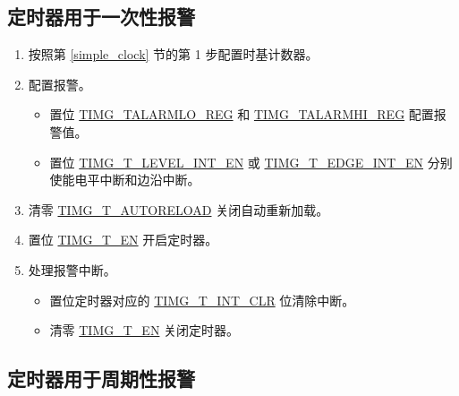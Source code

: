 \documentclass[main\_\_CN.tex]{subfiles}
\begin{document}
\subsection{定时器用于一次性报警}\label{Timer_Alarm}
\begin{enumerate}
    \item 按照第 \ref{simple_clock} 节的第 1 步配置时基计数器。
    \item 配置报警。
    \begin{itemize}
        \item 置位 \hyperref[regdesc:TIMGTXALARMLOREG]{TIMG\_TALARMLO\_REG} 和 \hyperref[regdesc:TIMGTXALARMHIREG]{TIMG\_TALARMHI\_REG} 配置报警值。
        \item 置位 \hyperref[fielddesc:TIMGTXLEVELINTEN]{TIMG\_T\_LEVEL\_INT\_EN} 或 \hyperref[fielddesc:TIMGTXEDGEINTEN]{TIMG\_T\_EDGE\_INT\_EN} 分别使能电平中断和边沿中断。
    \end{itemize}
    \item 清零 \hyperref[fielddesc:TIMGTXAUTORELOAD]{TIMG\_T\_AUTORELOAD} 关闭自动重新加载。
    \item 置位 \hyperref[fielddesc:TIMGTXEN]{TIMG\_T\_EN} 开启定时器。
    \item 处理报警中断。
    \begin{itemize}
        \item 置位定时器对应的 \hyperref[fielddesc:TIMGTXINTCLR]{TIMG\_T\_INT\_CLR} 位清除中断。
        \item 清零 \hyperref[fielddesc:TIMGTXEN]{TIMG\_T\_EN} 关闭定时器。
    \end{itemize}
\end{enumerate}

\subsection{定时器用于周期性报警}
\end{document}
